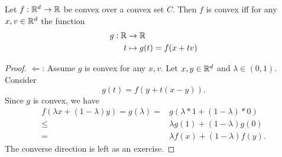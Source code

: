 \begin{theorem}
    Let $f:\mathbb{R}^d\rightarrow\mathbb{R}$ be convex over a convex set $C$. Then $f$ is convex iff for any $x,v\in \mathbb{R}^d$ the function
    \begin{equation}
        \begin{aligned}
            g:\mathbb{R}&\rightarrow\mathbb{R}\\
            t&\mapsto g(t) = f(x+tv)
        \end{aligned}
    \end{equation}
\end{theorem}
\begin{proof}
    $\Leftarrow$: Assume $g$ is convex for any $x,v$. Let $x,y\in \mathbb{R}^d$ and $\lambda\in (0,1)$. Consider
    \begin{equation}
        g(t) = f(y+ t(x-y)).
    \end{equation}
    Since $g$ is convex, we have
    \begin{equation}
        \begin{aligned}
            f(\lambda x + (1-\lambda)y) 
            = g(\lambda)
            =& g(\lambda*1 + (1-\lambda)*0)\\
            \leq& \lambda g(1) + (1-\lambda)g(0)\\
            =& \lambda f(x) + (1-\lambda)f(y).
        \end{aligned}
    \end{equation}
    The converse direction is left as an exercise.
\end{proof}


